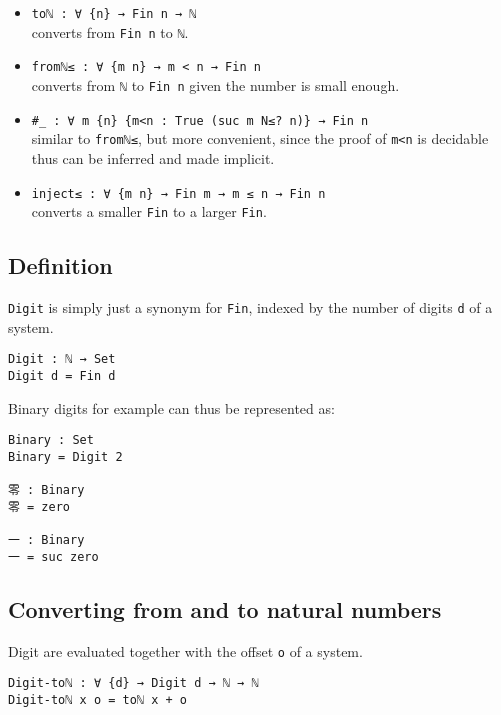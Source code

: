 \documentclass[../thesis.tex]{subfiles}
\begin{document}
\begin{itemize}
    \item {\lstinline|toℕ : ∀ {n} → Fin n → ℕ|}
        \\ converts from {\lstinline|Fin n|} to {\lstinline|ℕ|}.
    \item {\lstinline|fromℕ≤ : ∀ {m n} → m < n → Fin n|}
        \\ converts from {\lstinline|ℕ|} to {\lstinline|Fin n|} given the number is small enough.
    \item {\lstinline|#_ : ∀ m {n} {m<n : True (suc m N≤? n)} → Fin n|}
        \\ similar to {\lstinline|fromℕ≤|}, but more convenient, since the proof of {\lstinline|m<n|} is decidable thus can be inferred and made implicit.
    \item {\lstinline|inject≤ : ∀ {m n} → Fin m → m ≤ n → Fin n|}
        \\ converts a smaller {\lstinline|Fin|} to a larger {\lstinline|Fin|}.
\end{itemize}

\subsection{Definition}

{\lstinline|Digit|} is simply just a synonym for {\lstinline|Fin|}, indexed by
the number of digits {\lstinline|d|} of a system.

\begin{lstlisting}
Digit : ℕ → Set
Digit d = Fin d
\end{lstlisting}

Binary digits for example can thus be represented as:

\begin{lstlisting}
Binary : Set
Binary = Digit 2

零 : Binary
零 = zero

一 : Binary
一 = suc zero
\end{lstlisting}

\subsection{Converting from and to natural numbers}

Digit are evaluated together with the offset {\lstinline|o|} of a system.

\begin{lstlisting}
Digit-toℕ : ∀ {d} → Digit d → ℕ → ℕ
Digit-toℕ x o = toℕ x + o
\end{lstlisting}
\end{document}
